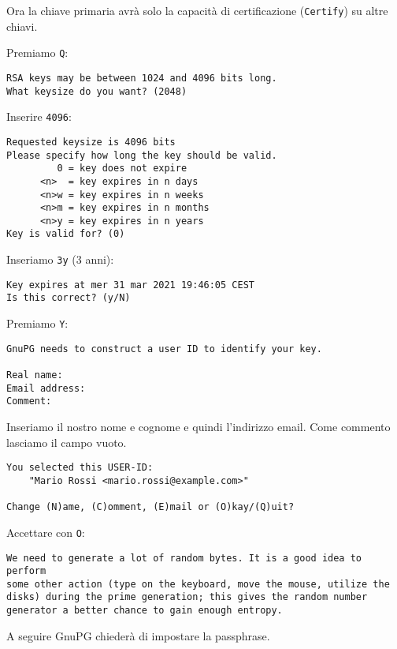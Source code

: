 \documentclass[a4paper,10pt]{article}
\begin{document}
Ora la chiave primaria avrà solo la capacità di certificazione (\texttt{Certify}) su altre chiavi.

Premiamo \texttt{Q}:

\begin{lstlisting}
RSA keys may be between 1024 and 4096 bits long.
What keysize do you want? (2048)
\end{lstlisting}


Inserire \texttt{4096}:

\begin{lstlisting}
Requested keysize is 4096 bits
Please specify how long the key should be valid.
         0 = key does not expire
      <n>  = key expires in n days
      <n>w = key expires in n weeks
      <n>m = key expires in n months
      <n>y = key expires in n years
Key is valid for? (0)
\end{lstlisting}


Inseriamo \texttt{3y} (3 anni):

\begin{lstlisting}
Key expires at mer 31 mar 2021 19:46:05 CEST
Is this correct? (y/N)
\end{lstlisting}

Premiamo \texttt{Y}:

\begin{lstlisting}
GnuPG needs to construct a user ID to identify your key.

Real name:
Email address:
Comment:
\end{lstlisting}


Inseriamo il nostro nome e cognome e quindi l'indirizzo email.
Come commento lasciamo il campo vuoto.

\begin{lstlisting}
You selected this USER-ID:
    "Mario Rossi <mario.rossi@example.com>"

Change (N)ame, (C)omment, (E)mail or (O)kay/(Q)uit?
\end{lstlisting}

Accettare con \texttt{O}:

\begin{lstlisting}
We need to generate a lot of random bytes. It is a good idea to perform
some other action (type on the keyboard, move the mouse, utilize the
disks) during the prime generation; this gives the random number
generator a better chance to gain enough entropy.
\end{lstlisting}

A seguire GnuPG chiederà di impostare la passphrase.
\end{document}
